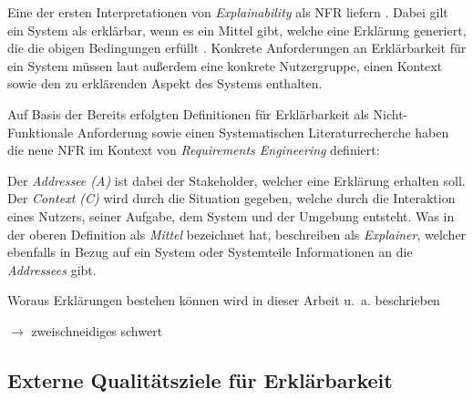 Eine der ersten Interpretationen von \textit{Explainability} als NFR liefern \citeauthor{kohl_explainability_2019}. Dabei gilt ein System als erklärbar, wenn es ein Mittel gibt, welche eine Erklärung generiert, die die obigen Bedingungen erfüllt \cite{kohl_explainability_2019}. Konkrete Anforderungen an Erklärbarkeit für ein System müssen laut \citeauthor{kohl_explainability_2019} außerdem eine konkrete Nutzergruppe, einen Kontext sowie den zu erklärenden Aspekt des Systems enthalten.

Auf Basis der Bereits erfolgten Definitionen für Erklärbarkeit als Nicht-Funktionale Anforderung sowie einen Systematischen Literaturrecherche haben \citeauthor{chazette_knowledge_nodate} die neue NFR im Kontext von \textit{Requirements Engineering} definiert:

\smallskip

\noindent{}

\smallskip

Der \textit{Addressee (A)} ist dabei der Stakeholder, welcher eine Erklärung erhalten soll. Der \textit{Context (C)} wird durch die Situation gegeben, welche durch die Interaktion eines Nutzers, seiner Aufgabe, dem System und der Umgebung entsteht. Was \citeauthor{kohl_explainability_2019} in der oberen Definition als \textit{Mittel} bezeichnet hat, beschreiben \citeauthor{chazette_end-users_nodate} als \textit{Explainer}, welcher ebenfalls in Bezug auf ein 
System oder Systemteile Informationen an die \textit{Addressees} gibt.



Woraus Erklärungen bestehen können wird in dieser Arbeit u.~a. beschrieben


\citeauthor{chazette_end-users_nodate} $\rightarrow$ zweischneidiges schwert

\subsection{Externe Qualitätsziele für Erklärbarkeit}
\label{02_basics:quality_quaracteristic}

